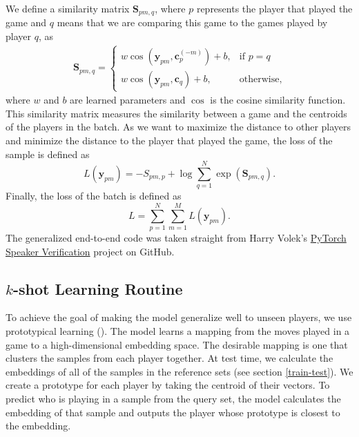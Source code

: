 \medskip\par 
We define a similarity matrix $\mathbf{S}_{pm, q}$, where $p$ represents the player that played the game and $q$ means that we are comparing this game to the games played by player $q$, as
\begin{align*}
    \mathbf{S}_{pm,q} = \begin{cases}
        w\cos(\mathbf{y}_{pm}, \mathbf{c}_p^{(-m)}) + b, &\text{if } p = q \\
        w\cos(\mathbf{y}_{pm}, \mathbf{c}_q) + b, & \text{otherwise},
    \end{cases}
\end{align*}
where $w$ and $b$ are learned parameters and $\cos$ is the cosine similarity function. This similarity matrix measures the similarity between a game and the centroids of the players in the batch. As we want to maximize the distance to other players and minimize the distance to the player that played the game, the loss of the sample is defined as
\[L(\mathbf{y}_{pm}) = -S_{pm, p} + \log\sum_{q=1}^N\exp(\mathbf{S}_{pm,q}).\]
Finally, the loss of the batch is defined as
\[L = \sum_{p=1}^N\sum_{m=1}^ML(\mathbf{y}_{pm}).\]
The generalized end-to-end code was taken straight from Harry Volek's \href{https://github.com/HarryVolek/PyTorch_Speaker_Verification}{PyTorch Speaker Verification} project on GitHub.

\subsection{$k$-shot Learning Routine}
\label{k-shot}
To achieve the goal of making the model generalize well to unseen players, we use prototypical learning (\citealp{Prototypical_learning}).
The model learns a mapping from the moves played in a game to a high-dimensional embedding space. The desirable mapping is one that clusters the samples from each player together.
At test time, we calculate the embeddings of all of the samples in the reference sets (see section \ref{train-test}). We create a prototype for each player by taking the centroid of their vectors. To predict who is playing in a sample from the query set, the model calculates the embedding of that sample and outputs the player whose prototype is closest to the embedding.

